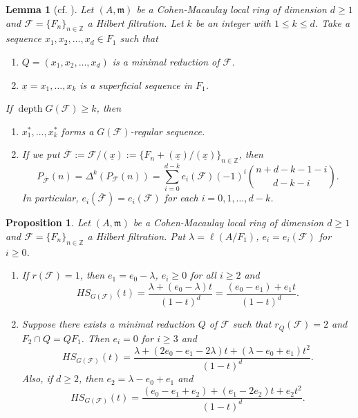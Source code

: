 \documentclass[12pt]{amsart}
\newtheorem{lem}[thm]{Lemma}
\newtheorem{prop}[thm]{Proposition}
\theoremstyle{definition}
\theoremstyle{remark}
\numberwithin{equation}{section}
\newcommand{\bbZ}{\ensuremath{\mathbb Z}}
\newcommand{\m}{{\mathfrak m}}
\DeclareMathOperator{\depth}{depth}
\newcommand{\FF}{\mathcal{F}}
\begin{document}
\begin{lem}[cf. \textrm{\cite[Lemma 3.14]{Mar89}}]  \label{Reduce}
Let $(A,\m)$ be a Cohen-Macaulay local ring of dimension $d \ge 1$ 
and $\FF=\{F_n\}_{n \in \bbZ}$ a Hilbert filtration. 
Let $k$ be an integer with $1 \le k \le d$. 
Take a sequence $x_1,x_2,\ldots,x_d \in F_1$  such that 
\begin{enumerate}
\item[\rm{(i)}] $Q=(x_1,x_2,\ldots,x_d)$ is a minimal reduction of $\FF$. 
\item[\rm{(ii)}] $\underline{x}=x_1,\ldots,x_k$ is a superficial sequence in $F_1$. 
\end{enumerate}
If $\depth G(\FF) \ge k$, then 
\begin{enumerate}
\item[\rm{(a)}] $x_1^{*},\ldots,x_k^{*}$ forms a $G(\FF)$-regular sequence. 
\item[\rm{(b)}] If we put $\overline{\FF}:=\FF/(\underline{x}):=\{F_n+(\underline{x})/(\underline{x})\}_{n \in \bbZ}$, then 
\[
P_{\overline{\FF}}(n)=\Delta^k(P_{\FF}(n))=\sum_{i=0}^{d-k} e_i(\FF)(-1)^i
{n+d-k-1-i \choose d-k-i}.
\] 
In particular, $e_i(\overline{\FF})=e_i(\FF)$ for each $i=0,1,\ldots,d-k$. 
\end{enumerate}
\end{lem}

\begin{prop}\label{HSred12}
Let $(A, \m) $ be a Cohen-Macaulay local ring 
of dimension $d \ge 1$ and $\FF=\{F_n\}_{n\in \bbZ}$ a Hilbert filtration.
Put $\lambda = \ell(A/F_1)$, $e_i=e_i(\FF)$ for $i \ge 0$.
\begin{enumerate}
 \item[\rm{(a)}] If $r(\FF)=1$, then $e_1=e_0-\lambda$, $e_i \ge 0$ for all $i \ge 2$ and 
\[
HS_{G(\FF)}(t)= \frac{\lambda + (e_0-\lambda)t}{(1-t)^d} =  \frac{(e_0-e_1) + e_1t}{(1-t)^d}. 
\]
\item[\rm{(b)}] Suppose there exists a minimal reduction $Q$ of $\FF$ such that $r_Q(\FF)=2$ and $F_2 \cap Q = QF_1$. 
Then $e_i=0$ for $i \ge 3$ and 
\[
HS_{G(\FF)}(t)= 
\frac{\lambda + (2e_0-e_1-2\lambda)t +(\lambda-e_0+e_1)t^2}{(1-t)^d}. 
\]
Also, if $d \ge2$, then $e_2=\lambda-e_0+e_1$ and 
\[
HS_{G(\FF)}(t)= 
\frac{(e_0-e_1+e_2) + (e_1-2e_2)t +e_2t^2}{(1-t)^d}. 
\]
\end{enumerate}
\end{prop}
\end{document}
